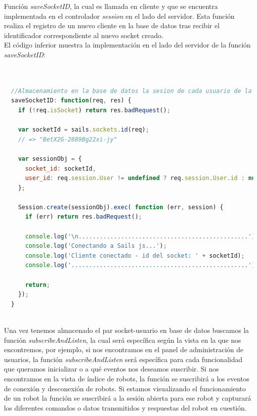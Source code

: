 Función \emph{saveSocketID}, la cual es llamada en cliente y que se encuentra implementada en el controlador \emph{session} en el lado del servidor. Esta función realiza el registro de un nuevo cliente en
la base de datos tras recibir el identificador correspondiente al nuevo socket creado.\\

El código inferior muestra la implementación en el lado del servidor de la función \emph{saveSocketID}:\\

\begin{lstlisting}[language=JavaScript]


  //Almacenamiento en la base de datos la sesion de cada usuario de la pagina
  saveSocketID: function(req, res) {
    if (!req.isSocket) return res.badRequest();

    var socketId = sails.sockets.id(req);
    // => "BetX2G-2889Bg22xi-jy"

    var sessionObj = {
      socket_id: socketId,
      user_id: req.session.User != undefined ? req.session.User.id : null
    };

    Session.create(sessionObj).exec( function (err, session) {
      if (err) return res.badRequest();

      console.log('\n................................................');
      console.log('Conectando a Sails js...');
      console.log('Cliente conectado - id del socket: ' + socketId);
      console.log('..................................................');

      return;
    });
  }
  
\end{lstlisting}

Una vez tenemos almacenado el par socket-usuario en base de datos buscamos la función \emph{subscribeAndListen}, la cual será específica según la vista en la que nos encontremos, por ejemplo, si
nos encontramos en el panel de administración de usuarios, la función \emph{subscribeAndListen} será específica para cada funcionalidad que queramos inicializar o a qué eventos nos deseamos suscribir.
Si nos encontramos en la vista de índice de robots, la función se suscribirá a los eventos de conexión y desconexión de robots. Si estamos visualizando el funcionamiento de un robot la función 
se suscribirá a la sesión abierta para ese robot y capturará los diferentes comandos o datos transmitidos y respuestas del robot en cuestión.\\

